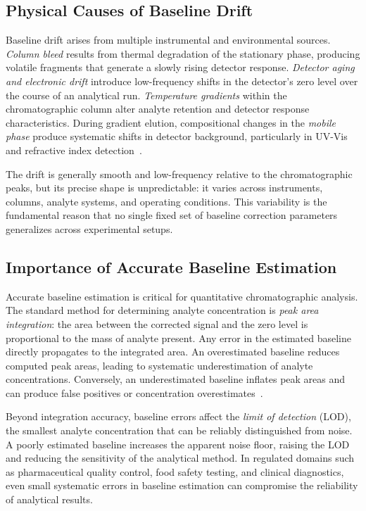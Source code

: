 \subsection{Physical Causes of Baseline Drift}

Baseline drift arises from multiple instrumental and environmental sources. \emph{Column bleed} results from thermal degradation of the stationary phase, producing volatile fragments that generate a slowly rising detector response. \emph{Detector aging and electronic drift} introduce low-frequency shifts in the detector's zero level over the course of an analytical run. \emph{Temperature gradients} within the chromatographic column alter analyte retention and detector response characteristics. During gradient elution, compositional changes in the \emph{mobile phase} produce systematic shifts in detector background, particularly in UV-Vis and refractive index detection~\cite{ning2014beads, skoog2017fundamentals}.

The drift is generally smooth and low-frequency relative to the chromatographic peaks, but its precise shape is unpredictable: it varies across instruments, columns, analyte systems, and operating conditions. This variability is the fundamental reason that no single fixed set of baseline correction parameters generalizes across experimental setups.

\subsection{Importance of Accurate Baseline Estimation}

Accurate baseline estimation is critical for quantitative chromatographic analysis. The standard method for determining analyte concentration is \emph{peak area integration}: the area between the corrected signal and the zero level is proportional to the mass of analyte present. Any error in the estimated baseline directly propagates to the integrated area. An overestimated baseline reduces computed peak areas, leading to systematic underestimation of analyte concentrations. Conversely, an underestimated baseline inflates peak areas and can produce false positives or concentration overestimates~\cite{ning2014beads, eilers2005baseline}.

Beyond integration accuracy, baseline errors affect the \emph{limit of detection} (LOD), the smallest analyte concentration that can be reliably distinguished from noise. A poorly estimated baseline increases the apparent noise floor, raising the LOD and reducing the sensitivity of the analytical method. In regulated domains such as pharmaceutical quality control, food safety testing, and clinical diagnostics, even small systematic errors in baseline estimation can compromise the reliability of analytical results.

